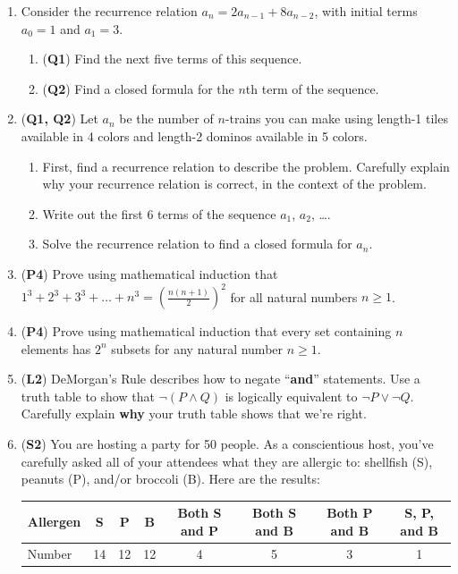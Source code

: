 \documentclass[12pt]{article}
\begin{document}
\begin{enumerate}
\item  Consider the recurrence relation $a_n = 2a_{n-1} + 8a_{n-2}$, with initial terms $a_0 = 1$ and $a_1 = 3$. 
\begin{enumerate}
    \item (\textbf{Q1}) Find the next five terms of this sequence.
    \item (\textbf{Q2}) Find a closed formula for the $n$th term of the sequence.
\end{enumerate}

\item (\textbf{Q1, Q2}) Let $a_n$ be the number of $n$-trains you can make using length-1 tiles available in 4 colors and length-2 dominos available in 5 colors.
\begin{enumerate}
    \item First, find a recurrence relation to describe the problem. Carefully explain why your recurrence relation is correct, in the context of the problem.
    \item Write out the first 6 terms of the sequence $a_1$, $a_2$, \ldots.
    \item Solve the recurrence relation to find a closed formula for $a_n$.
\end{enumerate}

\item (\textbf{P4}) Prove using mathematical induction that $1^3 + 2^3 + 3^3 + \ldots + n^3 = \left(\frac{n(n+1)}{2}\right)^2$ for all natural numbers $n \geq 1$. 

\item (\textbf{P4}) Prove using mathematical induction that every set containing $n$ elements has $2^n$ subsets for any natural number $n \geq 1$. 


\item  (\textbf{L2}) DeMorgan's Rule describes how to negate ``\textbf{and}'' statements. Use a truth table to show that  $\lnot(P \land Q)$ is logically equivalent to  $\lnot P \lor \lnot Q$.  Carefully explain \textbf{why} your truth table shows that we're right.

\item (\textbf{S2}) You are hosting a party for 50 people. As a conscientious host, you've carefully asked all of your attendees what they are allergic to: shellfish (S), peanuts (P), and/or broccoli (B). Here are the results:

\begin{tabular}{l|ccccccc}
Allergen & S  & P  & B  & Both S and P & Both S and B & Both P and B & S, P, and B \\\hline
Number   & 14 & 12 & 12 & 4            & 5            & 3            & 1
\end{tabular}


\end{enumerate}
\end{document}
